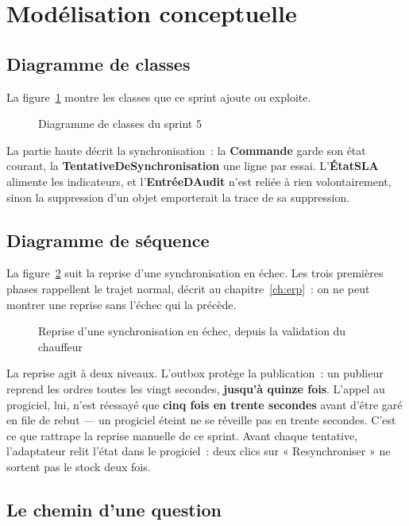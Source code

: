 \section{Modélisation conceptuelle}

\subsection{Diagramme de classes}

La figure~\ref{fig:class-s5} montre les classes que ce sprint ajoute ou exploite.

\begin{figure}[H]
\centering
{}
\caption{Diagramme de classes du sprint 5}
\label{fig:class-s5}
\end{figure}

La partie haute décrit la synchronisation~: la \textbf{Commande} garde son état courant, la
\textbf{TentativeDeSynchronisation} une ligne par essai. L'\textbf{ÉtatSLA} alimente les indicateurs,
et l'\textbf{EntréeDAudit} n'est reliée à rien volontairement, sinon la suppression d'un objet
emporterait la trace de sa suppression.

\subsection{Diagramme de séquence}

La figure~\ref{fig:seq-s5} suit la reprise d'une synchronisation en échec. Les trois premières phases
rappellent le trajet normal, décrit au chapitre~\ref{ch:erp}~: on ne peut montrer une reprise sans
l'échec qui la précède.

\begin{figure}[H]
\centering
{}
\caption{Reprise d'une synchronisation en échec, depuis la validation du chauffeur}
\label{fig:seq-s5}
\end{figure}

La reprise agit à deux niveaux. L'outbox protège la publication~: un publieur reprend les ordres
toutes les vingt secondes, \textbf{jusqu'à quinze fois}. L'appel au progiciel, lui, n'est réessayé
que \textbf{cinq fois en trente secondes} avant d'être garé en file de rebut — un progiciel éteint ne
se réveille pas en trente secondes. C'est ce que rattrape la reprise manuelle de ce sprint. Avant
chaque tentative, l'adaptateur relit l'état dans le progiciel~: deux clics sur « Resynchroniser » ne
sortent pas le stock deux fois.

\subsection{Le chemin d'une question}

